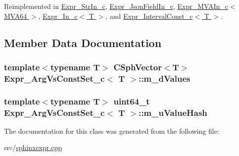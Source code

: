 Reimplemented in \hyperlink{classExpr__StrIn__c_ade280f607479af673eac963a39691f0f}{Expr\-\_\-\-Str\-In\-\_\-c}, \hyperlink{classExpr__JsonFieldIn__c_a8cd12fea0603dd58c72ad6500e5c1b20}{Expr\-\_\-\-Json\-Field\-In\-\_\-c}, \hyperlink{classExpr__MVAIn__c_a51087124678d26d29debc2fc02bbd48a}{Expr\-\_\-\-M\-V\-A\-In\-\_\-c$<$ M\-V\-A64 $>$}, \hyperlink{classExpr__In__c_a6b599b2dc4164abe75e58e3f10e146e3}{Expr\-\_\-\-In\-\_\-c$<$ T $>$}, and \hyperlink{classExpr__IntervalConst__c_a20faf025217ed1f36a607b4eec3e19cf}{Expr\-\_\-\-Interval\-Const\-\_\-c$<$ T $>$}.



\subsection{Member Data Documentation}
\hypertarget{classExpr__ArgVsConstSet__c_a6209640b02248d20bc284db2242af647}{
\subsubsection[{m\-\_\-d\-Values}]{\setlength{\rightskip}{0pt plus 5cm}template$<$typename T$>$ {\bf C\-Sph\-Vector}$<$T$>$ {\bf Expr\-\_\-\-Arg\-Vs\-Const\-Set\-\_\-c}$<$ T $>$\-::m\-\_\-d\-Values\hspace{0.3cm}{\ttfamily [protected]}}}\label{classExpr__ArgVsConstSet__c_a6209640b02248d20bc284db2242af647}
\hypertarget{classExpr__ArgVsConstSet__c_a36ef18a5262a821775d94a43d37a4bc9}{
\subsubsection[{m\-\_\-u\-Value\-Hash}]{\setlength{\rightskip}{0pt plus 5cm}template$<$typename T$>$ {\bf uint64\-\_\-t} {\bf Expr\-\_\-\-Arg\-Vs\-Const\-Set\-\_\-c}$<$ T $>$\-::m\-\_\-u\-Value\-Hash\hspace{0.3cm}{\ttfamily [protected]}}}\label{classExpr__ArgVsConstSet__c_a36ef18a5262a821775d94a43d37a4bc9}


The documentation for this class was generated from the following file\-:\begin{DoxyCompactItemize}
\item 
src/\hyperlink{sphinxexpr_8cpp}{sphinxexpr.\-cpp}\end{DoxyCompactItemize}
